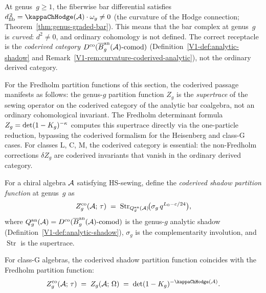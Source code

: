 \begin{remark}%
%
At genus~$g \geq 1$, the fiberwise bar differential satisfies
$\dfib^{\,2} = \kappaChHodge(\cA) \cdot \omega_g \neq 0$
(the curvature of the Hodge connection;
Theorem~\ref{thm:genus-graded-bar}). This means that the
bar complex at genus~$g$ is \emph{curved}: $d^2 \neq 0$,
and ordinary cohomology is not defined. The correct
receptacle is the \emph{coderived category}
$D^{\mathrm{co}}(\overline{B}^{\mathrm{an}}_g(\mathcal{A})\text{-comod})$
(Definition~\ref{V1-def:analytic-shadow} and
Remark~\ref{V1-rem:curvature-coderived-analytic}), not the
ordinary derived category.

For the Fredholm partition functions of this section, the
coderived passage manifests as follows: the genus-$g$
partition function $Z_g$ is the \emph{supertrace} of the
sewing operator on the coderived category of the analytic bar
coalgebra, not an ordinary cohomological invariant. The
Fredholm determinant formula
$Z_g = \det(1 - K_g)^{-\kappa}$ computes this
supertrace directly via the one-particle reduction, bypassing
the coderived formalism for the Heisenberg and class-G cases.
For classes L, C, M, the coderived category is essential: the
non-Fredholm corrections $\delta Z_g$ are coderived
invariants that vanish in the ordinary derived category.
\end{remark}

\begin{definition}%
%
For a chiral algebra $\mathcal{A}$ satisfying HS-sewing, define the
\emph{coderived shadow partition function} at genus~$g$ as
\begin{equation}%
Z_g^{\mathrm{co}}(\cA;\,\tau)
\;=\;
\operatorname{Str}_{Q_g^{\mathrm{an}}(\cA)}
\!\bigl(\sigma_g\,q^{L_0 - c/24}\bigr),
\end{equation}
where $Q_g^{\mathrm{an}}(\mathcal{A})
= D^{\mathrm{co}}(\overline{B}^{\mathrm{an}}_g(\mathcal{A})\text{-comod})$ is the
genus-$g$ analytic shadow
\textup{(}Definition~\textup{\ref{V1-def:analytic-shadow}}\textup{)},
$\sigma_g$ is the complementarity involution, and
$\operatorname{Str}$ is the supertrace.
\end{definition}

\begin{proposition}[Coderived = Fredholm for class~G;
\ClaimStatusProvedHere]%
%
For class-G algebras, the coderived shadow partition function
coincides with the Fredholm partition function:
\begin{equation}%
Z_g^{\mathrm{co}}(\cA;\,\tau)
\;=\;
Z_g(\cA;\,\Omega)
\;=\;
\det(1 - \sewker_g)^{-\kappaChHodge(\cA)}.
\end{equation}
\end{proposition}

